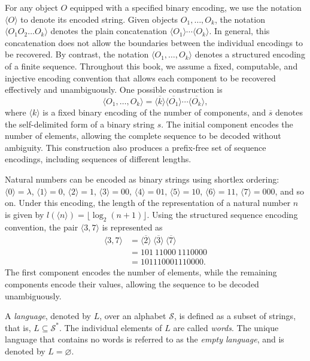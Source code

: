 For any object $O$ equipped with a specified binary encoding, we use the notation $\langle O \rangle$ to denote its encoded string. Given objects $O_1, \ldots, O_k$, the notation $\langle O_1 O_2 \ldots O_k \rangle$ denotes the plain concatenation $\langle O_1 \rangle \cdots \langle O_k \rangle$. In general, this concatenation does not allow the boundaries between the individual encodings to be recovered. By contrast, the notation $\langle O_1, \ldots, O_k \rangle$ denotes a structured encoding of a finite sequence. Throughout this book, we assume a fixed, computable, and injective encoding convention that allows each component to be recovered effectively and unambiguously. One possible construction is
\[
\langle O_1, \ldots, O_k \rangle =
\overline{\langle k \rangle}
\overline{\langle O_1 \rangle}
\cdots
\overline{\langle O_k \rangle},
\]
where $\langle k \rangle$ is a fixed binary encoding of the number of components, and $\overline{s}$ denotes the self-delimited form of a binary string $s$. The initial component encodes the number of elements, allowing the complete sequence to be decoded without ambiguity. This construction also produces a prefix-free set of sequence encodings, including sequences of different lengths.

\begin{example}
Natural numbers can be encoded as binary strings using shortlex ordering: $\langle 0 \rangle = \lambda$, $\langle 1 \rangle = 0$, $\langle 2 \rangle = 1$, $\langle 3 \rangle = 00$, $\langle 4 \rangle = 01$, $\langle 5 \rangle = 10$, $\langle 6 \rangle = 11$, $\langle 7 \rangle = 000$, and so on. Under this encoding, the length of the representation of a natural number $n$ is given by $l(\langle n \rangle) = \lfloor \log_2(n+1) \rfloor$. Using the structured sequence encoding convention, the pair $\langle 3,7 \rangle$ is represented as
\[
\begin{aligned}
\langle 3,7 \rangle
&= \overline{\langle 2 \rangle}
   \ \overline{\langle 3 \rangle}
   \ \overline{\langle 7 \rangle} \\
&= 101\ 11000\ 1110000 \\
&= 101110001110000.
\end{aligned}
\]
The first component encodes the number of elements, while the remaining components encode their values, allowing the sequence to be decoded unambiguously.
\end{example}

A \emph{language}, denoted by $L$, over an alphabet $\mathcal{S}$, is defined as a subset of strings, that is, $L \subseteq \mathcal{S}^{\ast}$. The individual elements of $L$ are called \emph{words}. The unique language that contains no words is referred to as the \emph{empty language}, and is denoted by $L = \varnothing$.

